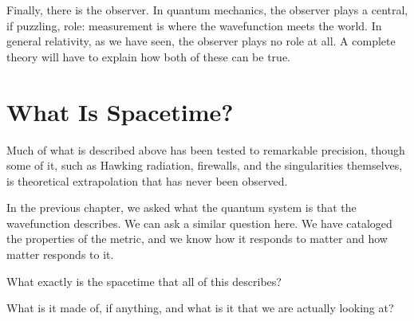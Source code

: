 Finally, there is the observer.
In quantum mechanics, the observer plays a central, if puzzling, role: measurement is where the wavefunction meets the world.
In general relativity, as we have seen, the observer plays no role at all.
A complete theory will have to explain how both of these can be true.


\section*{What Is Spacetime?}

Much of what is described above has been tested to remarkable precision, though some of it, such as Hawking radiation, firewalls, and the singularities themselves, is theoretical extrapolation that has never been observed.

In the previous chapter, we asked what the quantum system is that the wavefunction describes.
We can ask a similar question here.
We have cataloged the properties of the metric, and we know how it responds to matter and how matter responds to it.

What exactly is the spacetime that all of this describes?

What is it made of, if anything, and what is it that we are actually looking at?
